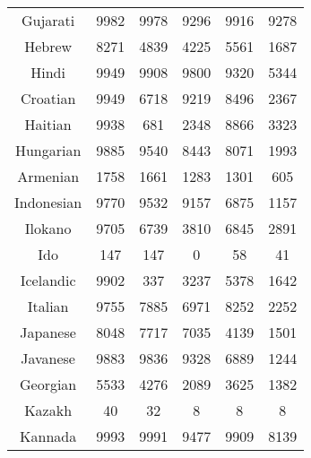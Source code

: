 \begin{figure}[h]
\begin{tabular}{cccccc}
Gujarati&9982&9978&9296&9916&9278\\
Hebrew&8271&4839&4225&5561&1687\\
Hindi&9949&9908&9800&9320&5344\\
Croatian&9949&6718&9219&8496&2367\\
Haitian&9938&681&2348&8866&3323\\
Hungarian&9885&9540&8443&8071&1993\\
Armenian&1758&1661&1283&1301&605\\
Indonesian&9770&9532&9157&6875&1157\\
Ilokano&9705&6739&3810&6845&2891\\
Ido&147&147&0&58&41\\
Icelandic&9902&337&3237&5378&1642\\
Italian&9755&7885&6971&8252&2252\\
Japanese&8048&7717&7035&4139&1501\\
Javanese&9883&9836&9328&6889&1244\\
Georgian&5533&4276&2089&3625&1382\\
Kazakh&40&32&8&8&8\\
Kannada&9993&9991&9477&9909&8139\\
\end{tabular}
\end{figure}
\clearpage
